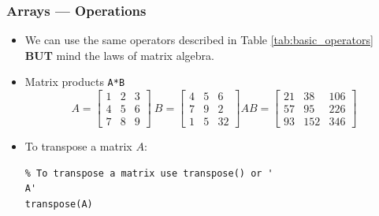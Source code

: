 \documentclass[11pt,xcolor={svgnames},aspectratio=169,usepdftitle=false,notheorems]{beamer}
\begin{document}
\begin{frame}[fragile]
    \frametitle{Arrays --- Operations}
    \begin{itemize}
        \item We can use the same operators described in Table \ref{tab:basic_operators} \alert{\textbf{BUT}} mind the laws of matrix algebra.
        \item Matrix products \verb+A*B+
        \[
        A = \begin{bmatrix}
            1 & 2 & 3 \\
            4 & 5 & 6 \\
            7 & 8 & 9 
            \end{bmatrix} \ 
        B = \begin{bmatrix}
            4 & 5 & 6 \\
            7 & 9 & 2 \\
            1 & 5 & 32
            \end{bmatrix}
        AB = \begin{bmatrix}
            21 & 38 & 106 \\
            57 & 95 & 226 \\
            93 & 152 & 346
        \end{bmatrix} 
        \]
        \item To transpose a matrix $A$:
\begin{lstlisting}
% To transpose a matrix use transpose() or '
A'
transpose(A)
\end{lstlisting}
    \end{itemize}
\end{frame}
\end{document}
